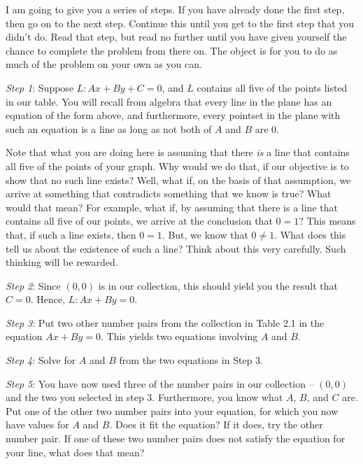 \documentclass[english]{book}
\begin{document}
I am going to give you a series of steps. If you have already done the first step, then go on to the next step. Continue this until you get to the first step that you didn't do. Read that step, but read no further until you have given yourself the chance to complete the problem from there on. The object is for you to do as much of the problem on your own as you can.

\vspace{0.3cm}

\emph{Step 1}: Suppose $L: Ax + By + C = 0$, and $L$ contains all five of the points listed in our table. You will recall from algebra that every line in the plane has an equation of the form above, and furthermore, every pointset in the plane with such an equation is a line as long as not both of $A$ and $B$ are $0$.

  Note that what you are doing here is assuming that there \emph{is} a line that contains all five of the points of your graph. Why would we do that, if our objective is to show that no such line exists? Well, what if, on the basis of that assumption, we arrive at something that contradicts something that we know is true? What would that mean? For example, what if, by assuming that there is a line that contains all five of our points, we arrive at the conclusion that $0 = 1$? This means that, if such a line exists, then $0 = 1$. But, we know that $0 \neq 1$. What does this tell us about the existence of such a line? Think about this very carefully. Such thinking will be rewarded.

\vspace{0.3cm}

\emph{Step 2}: Since $(0,0)$ is in our collection, this should yield you the result that $C = 0$. Hence, $L: Ax + By = 0$.

\vspace{0.3cm}

\emph{Step 3}: Put two other number pairs from the collection in Table 2.1 in the equation $Ax + By = 0$. This yields two equations involving $A$ and $B$.

\vspace{0.3cm}

\emph{Step 4}: Solve for $A$ and $B$ from the two equations in Step 3.

\vspace{0.3cm}

\emph{Step 5}: You have now used three of the number pairs in our collection -- $(0,0)$ and the two you selected in step 3. Furthermore, you know what $A$, $B$, and $C$ are. Put one of the other two number pairs into your equation, for which you now have values for $A$ and $B$. Does it fit the equation? If it does, try the other number pair. If one of these two number pairs does not satisfy the equation for your line, what does that mean?
\end{document}
